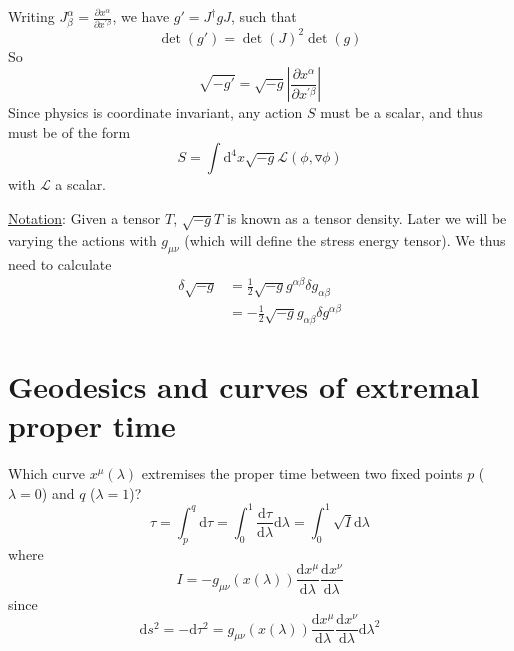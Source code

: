 \documentclass[a4paper]{book}
\theoremstyle{definition}
\theoremstyle{remark}
\begin{document}
Writing $J^\alpha_\beta = \frac{\partial x^\alpha}{\partial x^{'\beta}}$, we have $g' = J^\dagger g J$, such that 
\begin{equation}
    \det(g') = \det(J)^2 \det(g) 
\end{equation}
So 
\begin{equation}
    \sqrt{-g'} = \sqrt{-g}\left|\frac{\partial x^\alpha}{\partial x^{'\beta}}\right|
\end{equation}
Since physics is coordinate invariant, any action $S$ must be a scalar, and thus must be of the form 
\begin{equation}
    S = \int \text{d}^4 x \sqrt{-g}\mathcal{L}(\phi, \triangledown \phi)
\end{equation}
with $\mathcal{L}$ a scalar. \par \medskip 

\underline{Notation}: Given a tensor $T$, $\sqrt{-g}T$ is known as a tensor density. Later we will be varying the actions with $g_{\mu\nu}$ (which will define the stress energy tensor). We thus need to calculate 
\begin{equation}
    \begin{aligned}
        \delta \sqrt{-g} &= \frac{1}{2}\sqrt{-g}g^{\alpha\beta}\delta g_{\alpha \beta} \\
        &= -\frac{1}{2}\sqrt{-g}g_{\alpha\beta}\delta g^{\alpha \beta}
    \end{aligned}
\end{equation}

\section{Geodesics and curves of extremal proper time}

Which curve $x^\mu(\lambda)$ extremises the proper time between two fixed points $p$ ($\lambda = 0$) and $q$ ($\lambda = 1$)? 
\begin{equation}
    \tau = \int_{p}^{q} \text{d}\tau = \int_{0}^{1}\frac{\text{d}\tau}{\text{d}\lambda} \text{d}\lambda = \int_{0}^{1}\sqrt{I}\text{d}\lambda 
\end{equation}
where 
\begin{equation}
    I = -g_{\mu\nu}(x(\lambda)) \frac{\text{d}x^\mu}{\text{d}\lambda}\frac{\text{d}x^\nu}{\text{d}\lambda}
\end{equation}
since 
\begin{equation}
    \text{d}s^2 = -\text{d}\tau^2 = g_{\mu\nu}(x(\lambda)) \frac{\text{d}x^\mu}{\text{d}\lambda}\frac{\text{d}x^\nu}{\text{d}\lambda} \text{d}\lambda^2
\end{equation}
\end{document}
